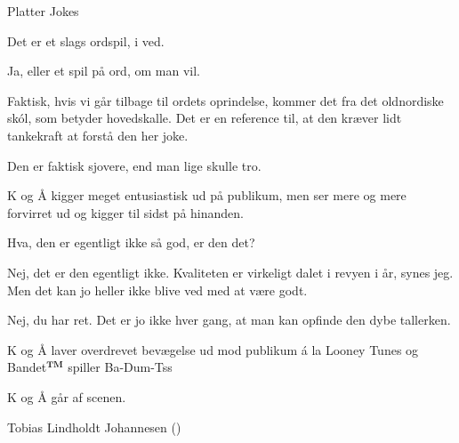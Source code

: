 \begin{Sketch}{Platter Jokes}
\begin{Replik}[K]
	Det er et slags ordspil, i ved.
\end{Replik}

\begin{Replik}[Å]
	Ja, eller et spil på ord, om man vil. 
\end{Replik}

\begin{Replik}[K]
	Faktisk, hvis vi går tilbage til ordets oprindelse, kommer det fra det oldnordiske skól, som betyder hovedskalle. Det er en reference til, at den kræver lidt tankekraft at forstå den her joke.
\end{Replik}
\begin{Replik}[Å]
	Den er faktisk sjovere, end man lige skulle tro.
\end{Replik}

\begin{Regi}
	K og Å kigger meget entusiastisk ud på publikum, men ser mere og mere forvirret ud og kigger til sidst på hinanden.
\end{Regi}

\begin{Replik}[K]
	Hva, den er egentligt ikke så god, er den det?
\end{Replik}

\begin{Replik}[Å]
	Nej, det er den egentligt ikke. Kvaliteten er virkeligt dalet i revyen i år, synes jeg. Men det kan jo heller ikke blive ved med at være godt.
\end{Replik}

\begin{Replik}[K]
	Nej, du har ret. Det er jo ikke hver gang, at man kan opfinde den dybe tallerken.
\end{Replik}

\begin{Regi}
	K og Å laver overdrevet bevægelse ud mod publikum á la Looney Tunes og Bandet$^{\textbf{TM}}$ spiller Ba-Dum-Tss
\end{Regi}

\begin{Regi}
	K og Å går af scenen.
\end{Regi}

\end{Sketch}

\begin{Footer}
Tobias Lindholdt Johannesen (\CERM)
\end{Footer}

